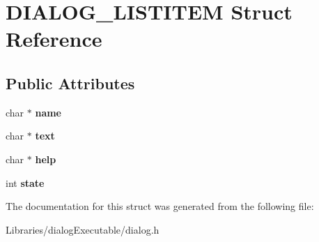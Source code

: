 \hypertarget{struct_d_i_a_l_o_g___l_i_s_t_i_t_e_m}{}\section{D\+I\+A\+L\+O\+G\+\_\+\+L\+I\+S\+T\+I\+T\+EM Struct Reference}
\label{struct_d_i_a_l_o_g___l_i_s_t_i_t_e_m}
\subsection*{Public Attributes}
\begin{DoxyCompactItemize}
\item 
char $\ast$ {\bfseries name}\hypertarget{struct_d_i_a_l_o_g___l_i_s_t_i_t_e_m_a61a17bd67b446393812a44c96e49948d}{}\label{struct_d_i_a_l_o_g___l_i_s_t_i_t_e_m_a61a17bd67b446393812a44c96e49948d}

\item 
char $\ast$ {\bfseries text}\hypertarget{struct_d_i_a_l_o_g___l_i_s_t_i_t_e_m_aaf478ccd5054a7633c946a18e8c5e2c9}{}\label{struct_d_i_a_l_o_g___l_i_s_t_i_t_e_m_aaf478ccd5054a7633c946a18e8c5e2c9}

\item 
char $\ast$ {\bfseries help}\hypertarget{struct_d_i_a_l_o_g___l_i_s_t_i_t_e_m_a24b851c5ed3ee91f301efb9ea2ebdae3}{}\label{struct_d_i_a_l_o_g___l_i_s_t_i_t_e_m_a24b851c5ed3ee91f301efb9ea2ebdae3}

\item 
int {\bfseries state}\hypertarget{struct_d_i_a_l_o_g___l_i_s_t_i_t_e_m_a60bda2d290ea842ca48da41fdd86c628}{}\label{struct_d_i_a_l_o_g___l_i_s_t_i_t_e_m_a60bda2d290ea842ca48da41fdd86c628}

\end{DoxyCompactItemize}


The documentation for this struct was generated from the following file\+:\begin{DoxyCompactItemize}
\item 
Libraries/dialog\+Executable/dialog.\+h\end{DoxyCompactItemize}
